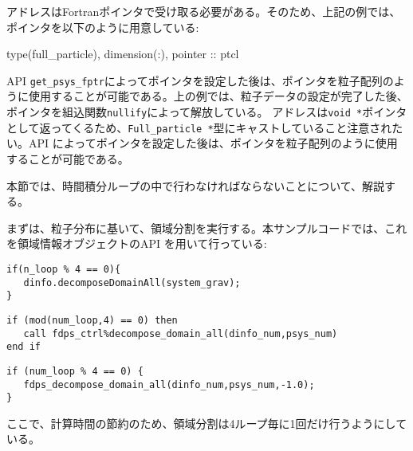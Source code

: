 \endifC
{}
\ifFtn%
アドレスはFortranポインタで受け取る必要がある。そのため、上記の例では、ポインタを以下のように用意している:
\begin{screen}
\begin{spverbatim}
type(full_particle), dimension(:), pointer :: ptcl
\end{spverbatim}  
\end{screen}
API \texttt{get\_psys\_fptr}によってポインタを設定した後は、ポインタを粒子配列のように使用することが可能である。上の例では、粒子データの設定が完了した後、ポインタを組込関数\texttt{nullify}によって解放している。
\endifFtn
\ifC%
アドレスは\texttt{void *}ポインタとして返ってくるため、\texttt{Full\_particle *}型にキャストしていること注意されたい。API \getPsysPtr によってポインタを設定した後は、ポインタを粒子配列のように使用することが可能である。
\endifC

本節では、時間積分ループの中で行わなければならないことについて、解説する。

まずは、粒子分布に基いて、領域分割を実行する。本サンプルコードでは、これを領域情報オブジェクトのAPI \decomposeDomainAll を用いて行っている:
\ifCpp%
\begin{lstlisting}[caption=領域分割の実行]
if(n_loop % 4 == 0){
   dinfo.decomposeDomainAll(system_grav);
}
\end{lstlisting}
\endifCpp
\ifFtn%
\begin{lstlisting}[caption=領域分割の実行]
if (mod(num_loop,4) == 0) then
   call fdps_ctrl%decompose_domain_all(dinfo_num,psys_num)
end if
\end{lstlisting}
\endifFtn
\ifC%
\begin{lstlisting}[caption=領域分割の実行]
if (num_loop % 4 == 0) {
   fdps_decompose_domain_all(dinfo_num,psys_num,-1.0);
}
\end{lstlisting}
\endifC
ここで、計算時間の節約のため、領域分割は4ループ毎に1回だけ行うようにしている。


